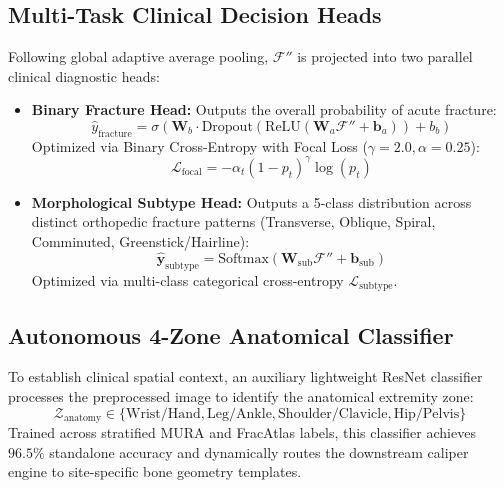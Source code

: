 \documentclass[journal]{IEEEtran}
\begin{document}
\subsection{Multi-Task Clinical Decision Heads}
Following global adaptive average pooling, $\mathcal{F}''$ is projected into two parallel clinical diagnostic heads:
\begin{itemize}
    \item \textbf{Binary Fracture Head:} Outputs the overall probability of acute fracture:
    \begin{equation}
        \hat{y}_{\text{fracture}} = \sigma\left(\mathbf{W}_b \cdot \text{Dropout}(\text{ReLU}(\mathbf{W}_a \mathcal{F}'' + \mathbf{b}_a)) + b_b\right)
    \end{equation}
    Optimized via Binary Cross-Entropy with Focal Loss ($\gamma = 2.0, \alpha = 0.25$):
    \begin{equation}
        \mathcal{L}_{\text{focal}} = -\alpha_t (1 - p_t)^\gamma \log(p_t)
    \end{equation}
    \item \textbf{Morphological Subtype Head:} Outputs a 5-class distribution across distinct orthopedic fracture patterns (Transverse, Oblique, Spiral, Comminuted, Greenstick/Hairline):
    \begin{equation}
        \hat{\mathbf{y}}_{\text{subtype}} = \text{Softmax}\left(\mathbf{W}_{\text{sub}} \mathcal{F}'' + \mathbf{b}_{\text{sub}}\right)
    \end{equation}
    Optimized via multi-class categorical cross-entropy $\mathcal{L}_{\text{subtype}}$.
\end{itemize}

\subsection{Autonomous 4-Zone Anatomical Classifier}
To establish clinical spatial context, an auxiliary lightweight ResNet classifier processes the preprocessed image to identify the anatomical extremity zone:
\begin{equation}
    \mathcal{Z}_{\text{anatomy}} \in \{\text{Wrist/Hand}, \text{Leg/Ankle}, \text{Shoulder/Clavicle}, \text{Hip/Pelvis}\}
\end{equation}
Trained across stratified MURA and FracAtlas labels, this classifier achieves $96.5\%$ standalone accuracy and dynamically routes the downstream caliper engine to site-specific bone geometry templates.
\end{document}
